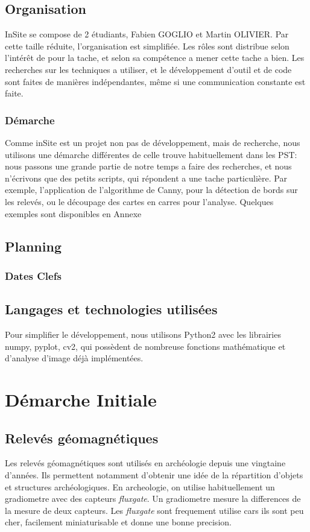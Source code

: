 \documentclass[a4paper, 12pt, titlepage, oneside, french]{article}
\begin{document}
	\subsection{Organisation}
	InSite se compose de 2 étudiants, Fabien GOGLIO et Martin OLIVIER. Par cette taille réduite, l'organisation est simplifiée. Les rôles sont distribue selon l'intérêt de pour la tache, et selon sa compétence a mener cette tache a bien. Les recherches sur les techniques a utiliser, et le développement d'outil et de code sont faites de manières indépendantes, même si une communication constante est faite. 
	\subsubsection{Démarche}
	Comme inSite est un projet non pas de développement, mais de recherche, nous utilisons une démarche différentes de celle trouve habituellement dans les PST: nous passons une grande partie de notre temps a faire des recherches, et nous n'écrivons que des petits scripts, qui répondent a une tache particulière. Par exemple, l'application de l'algorithme de Canny, pour la détection de bords sur les relevés,
	ou le découpage des cartes en carres pour l'analyse. Quelques exemples sont disponibles en Annexe %
	\subsection{Planning}
	\subsubsection{Dates Clefs}
	\subsection{Langages et technologies utilisées}
	Pour simplifier le développement, nous utilisons Python2 avec les librairies numpy, pyplot, cv2, qui possèdent de nombreuse fonctions mathématique et d'analyse d'image déjà implémentées.
	\newpage

\section{Démarche Initiale}
	
	\subsection{Relevés géomagnétiques}
	Les relevés géomagnétiques sont utilisés en archéologie depuis une vingtaine d'années. Ils permettent notamment d'obtenir une idée de la répartition d'objets et structures archéologiques. En archeologie, on utilise habituellement un gradiometre avec des capteurs \textit{fluxgate}. Un gradiometre mesure la differences de la mesure de deux capteurs. Les \textit{fluxgate} sont frequement utilise cars ils sont peu cher, facilement miniaturisable et donne une bonne precision.
\end{document}
